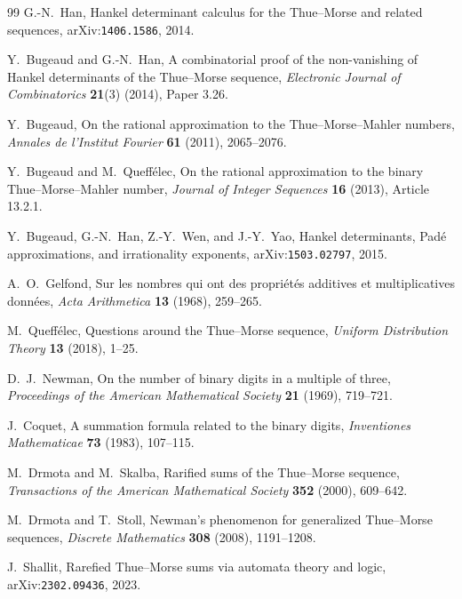 \documentclass[11pt,oneside]{article}
\numberwithin{equation}{section}
\theoremstyle{definition}
\theoremstyle{remark}
\begin{document}
\begin{thebibliography}{99}
G.-N.~Han,
\newblock Hankel determinant calculus for the Thue--Morse and related
sequences,
\newblock arXiv:\nolinkurl{1406.1586}, 2014.

Y.~Bugeaud and G.-N.~Han,
\newblock A combinatorial proof of the non-vanishing of Hankel determinants
of the Thue--Morse sequence,
\newblock \emph{Electronic Journal of Combinatorics} \textbf{21}(3) (2014),
Paper 3.26.

Y.~Bugeaud,
\newblock On the rational approximation to the Thue--Morse--Mahler numbers,
\newblock \emph{Annales de l'Institut Fourier} \textbf{61} (2011),
2065--2076.

Y.~Bugeaud and M.~Queff\'elec,
\newblock On the rational approximation to the binary Thue--Morse--Mahler
number,
\newblock \emph{Journal of Integer Sequences} \textbf{16} (2013),
Article 13.2.1.

Y.~Bugeaud, G.-N.~Han, Z.-Y.~Wen, and J.-Y.~Yao,
\newblock Hankel determinants, Pad\'e approximations, and irrationality
exponents,
\newblock arXiv:\nolinkurl{1503.02797}, 2015.

A.~O.~Gelfond,
\newblock Sur les nombres qui ont des propri\'et\'es additives et
multiplicatives donn\'ees,
\newblock \emph{Acta Arithmetica} \textbf{13} (1968), 259--265.

M.~Queff\'elec,
\newblock Questions around the Thue--Morse sequence,
\newblock \emph{Uniform Distribution Theory} \textbf{13} (2018), 1--25.

D.~J.~Newman,
\newblock On the number of binary digits in a multiple of three,
\newblock \emph{Proceedings of the American Mathematical Society}
\textbf{21} (1969), 719--721.

J.~Coquet,
\newblock A summation formula related to the binary digits,
\newblock \emph{Inventiones Mathematicae} \textbf{73} (1983), 107--115.

M.~Drmota and M.~Skalba,
\newblock Rarified sums of the Thue--Morse sequence,
\newblock \emph{Transactions of the American Mathematical Society}
\textbf{352} (2000), 609--642.

M.~Drmota and T.~Stoll,
\newblock Newman's phenomenon for generalized Thue--Morse sequences,
\newblock \emph{Discrete Mathematics} \textbf{308} (2008), 1191--1208.

J.~Shallit,
\newblock Rarefied Thue--Morse sums via automata theory and logic,
\newblock arXiv:\nolinkurl{2302.09436}, 2023.


\end{thebibliography}
\end{document}
